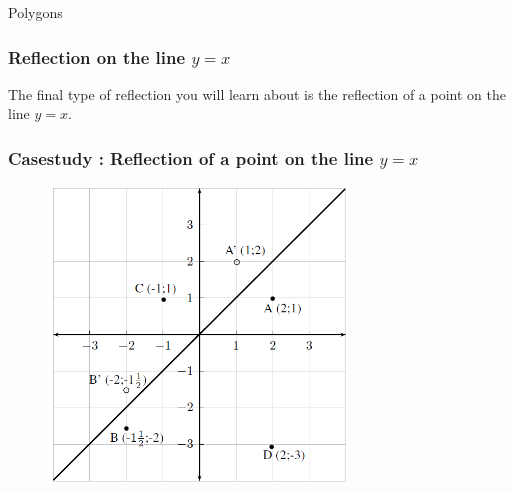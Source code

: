 \begin{exercises}{Polygons}
{\begin{mdframed}[linewidth=4, leftmargin=40, rightmargin=40]
\begin{exercise}
    \end{exercise}
    \end{mdframed}
    }
    \noindent
  
        
        \label{m39358*uid77754}
            \subsubsection{ Reflection on the line $y=x$}
            \nopagebreak
            
          
          \label{m39358*id71812}The final type of reflection you will learn about is the reflection of a point on the line $y=x$.\par 
\label{m39358*secfhsst!!!underscore!!!id2638}
            \subsubsection{  Casestudy : Reflection of a point on the line $y=x$ }
            \nopagebreak
            
          \label{m39358*id71852}
            
    \setcounter{subfigure}{0}


	\begin{figure}[H] %
    \begin{center}
    \label{m39358*id71857!!!underscore!!!media}\label{m39358*id71857!!!underscore!!!printimage}\includegraphics[width=300px]{col11306.imgs/m39358_MG10C14_029.png} %
        
      \vspace{2pt}
    \vspace{.1in}
    
    \end{center}


\end{figure}
\end{exercises}
